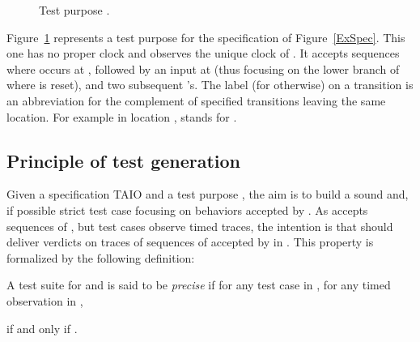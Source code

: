 \documentclass{LMCS}
\theoremstyle{plain}\newtheorem{proposition}[thm]{Proposition}
\begin{document}
\begin{figure}[htbp]
\begin{center}
\caption{Test purpose .
}\label{ExObj}
\end{center}
\end{figure}

\begin{exa} 
Figure~\ref{ExObj} represents a test purpose  for the specification 
of Figure~\ref{ExSpec}. This one has no proper clock and observes the unique
clock  of .  It accepts sequences where  occurs at ,
followed by an input  at  (thus focusing on the lower branch
of  where  is reset), and two subsequent 's. The label  (for otherwise) on a transition is an abbreviation for the complement of specified transitions leaving the same location.
For example in location ,  stands for 
.
\end{exa}

\subsection{Principle of test generation}

Given a specification TAIO  and a test purpose , the aim is to build a sound and, if possible strict 
test case  focusing on behaviors accepted by .  
As  accepts sequences of , but  test cases observe timed traces,
the intention is that  should deliver  verdicts 
on traces of sequences of  accepted by  in .  
This property is formalized by the following definition: 
\begin{defi}
\label{def:precise}
A test suite  for  and  is said to be {\em precise} 
if for any test case  in ,
for any timed observation  in , 

if and only if 
.
\end{defi}
\end{document}
